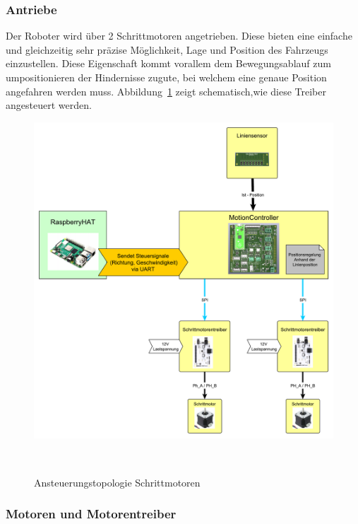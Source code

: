 \documentclass[main.tex]{subfiles} %
\begin{document}

\subsubsection{Antriebe}

Der Roboter wird über 2 Schrittmotoren angetrieben. Diese bieten eine einfache
und gleichzeitig sehr präzise Möglichkeit, Lage und Position des Fahrzeugs
einzustellen. Diese Eigenschaft kommt vorallem dem Bewegungsablauf zum
umpositionieren der Hindernisse zugute, bei welchem eine genaue Position
angefahren werden muss.
Abbildung~\ref{Ansteuerungstopologie_Schrittmotorentreiber} zeigt
schematisch,wie diese Treiber angesteuert werden.

\begin{figure}[H]
    \centering
    \includegraphics[width = 1\linewidth]{./fig_Antriebe/Konzept_Motoransteuerung.pdf}
    \caption{Ansteuerungstopologie Schrittmotoren}~\label{Ansteuerungstopologie_Schrittmotorentreiber}
\end{figure}


\subsubsection*{Motoren und Motorentreiber}
\end{document}
